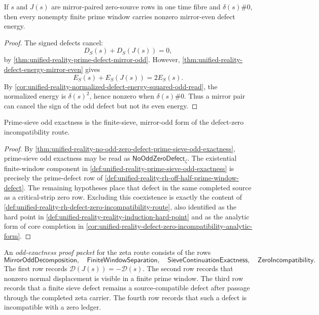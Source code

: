 \begin{corollary}
\label{cor:unified-reality-mirror-pairs-do-not-cancel-defect-energy}
If $s$ and $J(s)$ are mirror-paired zero-source rows in one time fibre
and $\delta(s)\#0$, then every nonempty finite prime window carries
nonzero mirror-even defect energy.
\end{corollary}

\begin{proof}
The signed defects cancel:
$$
D_S(s)+D_S(J(s))=0,
$$
by \autoref{thm:unified-reality-prime-defect-mirror-odd}.  However,
\autoref{thm:unified-reality-defect-energy-mirror-even} gives
$$
E_S(s)+E_S(J(s))=2E_S(s).
$$
By
\autoref{cor:unified-reality-normalized-defect-energy-squared-odd-read},
the normalized energy is $\delta(s)^2$, hence nonzero when
$\delta(s)\#0$.  Thus a mirror pair can cancel the sign of the odd
defect but not its even energy.
\end{proof}

\begin{theorem}
\label{thm:unified-reality-prime-sieve-odd-exactness-defect-zero}
Prime-sieve odd exactness is the finite-sieve, mirror-odd form of the
defect-zero incompatibility route.
\end{theorem}

\begin{proof}
By
\autoref{thm:unified-reality-no-odd-zero-defect-prime-sieve-odd-exactness},
prime-sieve odd exactness may be read as
$\mathsf{NoOddZeroDefect}_{\zeta}$.
The existential finite-window component in
\autoref{def:unified-reality-prime-sieve-odd-exactness} is precisely the
prime-defect row of
\autoref{def:unified-reality-rh-off-half-prime-window-defect}.  The
remaining hypotheses place that defect in the same completed source as a
critical-strip zero row.  Excluding this coexistence is exactly the
content of
\autoref{def:unified-reality-rh-defect-zero-incompatibility-route}, also
identified as the hard point in
\autoref{def:unified-reality-reality-induction-hard-point} and as the
analytic form of core completion in
\autoref{cor:unified-reality-defect-zero-incompatibility-analytic-form}.
\end{proof}

\begin{definition}
\label{def:unified-reality-odd-exactness-proof-packet}
An \emph{odd-exactness proof packet} for the zeta route consists of the
rows
$$
\mathsf{MirrorOddDecomposition},
\quad
\mathsf{FiniteWindowSeparation},
\quad
\mathsf{SieveContinuationExactness},
\quad
\mathsf{ZeroIncompatibility}.
$$
The first row records $\mathcal D(J(s))=-\mathcal D(s)$.  The second row
records that nonzero normal displacement is visible in a finite prime
window.  The third row records that a finite sieve defect remains a
source-compatible defect after passage through the completed zeta carrier.
The fourth row records that such a defect is incompatible with a zero
ledger.
\end{definition}

